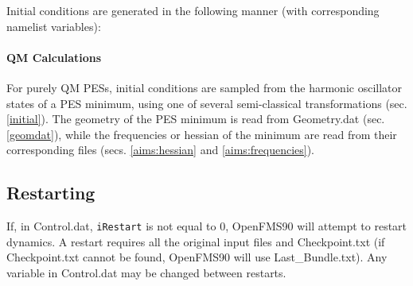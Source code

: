 \documentclass[11pt]{article}
\newcommand\bfec[1]{\textcolor{orange}{\textit{ XXX BFEC: #1 XXX }}}
\begin{document}
Initial conditions are generated in the following manner (with corresponding namelist variables):

\paragraph{QM Calculations}
For purely QM PESs, initial conditions are sampled from the harmonic oscillator states of a PES minimum, using one of several semi-classical transformations (sec. \ref{initial}). The geometry of the PES minimum is read from Geometry.dat (sec. \ref{geomdat}), while the frequencies or hessian of the minimum are read from their corresponding files (secs. \ref{aims:hessian} and \ref{aims:frequencies}).



\subsection{Restarting}
\label{restart} 

If, in Control.dat, \verb*$iRestart$ is not equal to 0, OpenFMS90 will attempt to restart dynamics. A restart requires all the original input files and Checkpoint.txt (if Checkpoint.txt cannot be found, OpenFMS90 will use Last\_Bundle.txt). Any variable in Control.dat may be changed between restarts.
\end{document}
